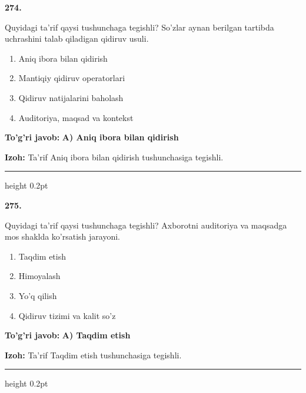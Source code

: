 \documentclass[10pt,a4paper,oneside]{article}
\begin{document}
\noindent\textbf{\color{ink}274.}
\par
Quyidagi ta'rif qaysi tushunchaga tegishli? So'zlar aynan berilgan tartibda uchrashini talab qiladigan qidiruv usuli.
\begin{enumerate}[label=\Alph*),leftmargin=9mm]
\item Aniq ibora bilan qidirish
\item Mantiqiy qidiruv operatorlari
\item Qidiruv natijalarini baholash
\item Auditoriya, maqsad va kontekst
\end{enumerate}
\begin{tcolorbox}[enhanced,breakable,colback=teal!4,colframe=teal!50!black,boxrule=0.5pt,arc=1.1mm,left=3mm,right=3mm,top=1.7mm,bottom=1.7mm,before skip=2mm,after skip=2mm]
\textbf{\color{teal}To'g'ri javob:} \textbf{A) Aniq ibora bilan qidirish}
\par\smallskip
\textbf{Izoh:} Ta'rif Aniq ibora bilan qidirish tushunchasiga tegishli.
\end{tcolorbox}
\vspace{2mm}\hrule height 0.2pt \vspace{3mm}

\noindent\textbf{\color{ink}275.}
\par
Quyidagi ta'rif qaysi tushunchaga tegishli? Axborotni auditoriya va maqsadga mos shaklda ko'rsatish jarayoni.
\begin{enumerate}[label=\Alph*),leftmargin=9mm]
\item Taqdim etish
\item Himoyalash
\item Yo'q qilish
\item Qidiruv tizimi va kalit so'z
\end{enumerate}
\begin{tcolorbox}[enhanced,breakable,colback=teal!4,colframe=teal!50!black,boxrule=0.5pt,arc=1.1mm,left=3mm,right=3mm,top=1.7mm,bottom=1.7mm,before skip=2mm,after skip=2mm]
\textbf{\color{teal}To'g'ri javob:} \textbf{A) Taqdim etish}
\par\smallskip
\textbf{Izoh:} Ta'rif Taqdim etish tushunchasiga tegishli.
\end{tcolorbox}
\vspace{2mm}\hrule height 0.2pt \vspace{3mm}
\end{document}
